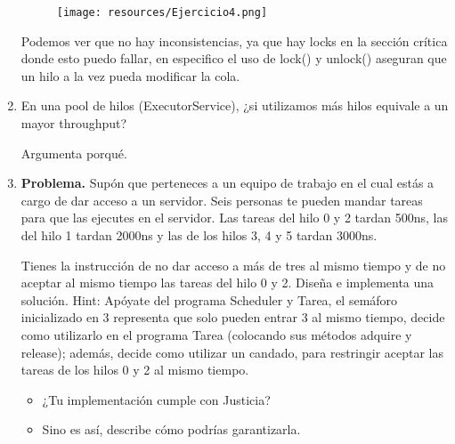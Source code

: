 \begin{enumerate}
\begin{figure}[h]
    \centering
    \texttt{[image: resources/Ejercicio4.png]}
\end{figure}

Podemos ver que no hay inconsistencias, ya que hay locks en la sección crítica donde esto puedo fallar, en especifico el uso de lock()  y unlock() aseguran que un hilo a la vez pueda modificar la cola.
\hfill

\item En una pool de hilos (ExecutorService), ¿si utilizamos más hilos equivale a un mayor throughput?

Argumenta porqué.

\hfill

\item \textbf{Problema.} Supón que perteneces a un equipo de trabajo en el cual estás a cargo de dar acceso a un servidor. Seis personas te pueden mandar tareas para que las ejecutes en el servidor. Las tareas del hilo 0 y 2 tardan 500ns, las del hilo 1 tardan 2000ns y las de los hilos 3, 4 y 5 tardan 3000ns.

Tienes la instrucción de no dar acceso a más de tres al mismo tiempo y de no aceptar al mismo tiempo las tareas del hilo 0 y 2. Diseña e implementa una solución. Hint: Apóyate del programa Scheduler y Tarea, el semáforo inicializado en 3 representa que solo pueden entrar 3 al mismo tiempo, decide como utilizarlo en el programa Tarea (colocando sus métodos adquire y release); además, decide como utilizar un candado, para restringir aceptar las tareas de los hilos 0 y 2 al mismo tiempo.

\begin{itemize}
    \item ¿Tu implementación cumple con Justicia?

    \item Sino es así, describe cómo podrías garantizarla.
\end{itemize}
    
\end{enumerate}
